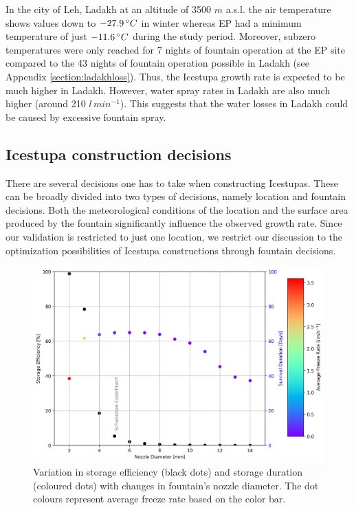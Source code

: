 \documentclass[utf8]{frontiersSCNS} %
\begin{document}
In the city of Leh, Ladakh at an altitude of 3500 $m$ a.s.l. the air temperature shows values down to $-27.9\, \degree
C$ in winter \citep{Chevuturi_2018} whereas EP had a minimum temperature of just  $-11.6\,\degree C$ during the
study period. Moreover, subzero temperatures were only reached for 7 nights of fountain operation at the EP
site compared to the 43 nights of fountain operation possible in Ladakh (see Appendix \ref{section:ladakhloss}). Thus,
the Icestupa growth rate is expected to be much higher in Ladakh. However, water spray rates in Ladakh are also much
higher (around 210 $l\,min^{-1}$). This suggests that the water losses in Ladakh could be caused by excessive fountain spray.

\subsection{Icestupa construction decisions} There are several decisions one has to take when constructing Icestupas.
These can be broadly divided into two types of decisions, namely location and fountain decisions.  Both the
meteorological conditions of the location and the surface area produced by the fountain significantly influence the
observed growth rate. Since our validation is restricted to just one location, we restrict our discussion to the
optimization possibilities of Icestupa constructions through fountain decisions.

  \begin{figure} \begin{center} \includegraphics[width=15 cm]{Figures/Figure_10.jpg} \end{center} \caption{Variation
in storage efficiency (black dots) and storage duration (coloured dots) with changes in fountain's nozzle
diameter.  The dot colours represent average freeze rate based on the color bar.} \label{fig:dia_f} \end{figure}
  
\end{document}

